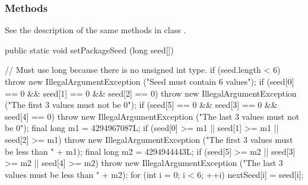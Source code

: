 \subsubsection* {Methods}
See the description of the same methods in class .
\begin{code}

   public static void setPackageSeed (long seed[]) \begin{hide} {
      // Must use long because there is no unsigned int type.
      if (seed.length < 6)
         throw new IllegalArgumentException ("Seed must contain 6 values");
      if (seed[0] == 0 && seed[1] == 0 && seed[2] == 0)
         throw new IllegalArgumentException
             ("The first 3 values must not be 0");
      if (seed[5] == 0 && seed[3] == 0 && seed[4] == 0)
         throw new IllegalArgumentException
             ("The last 3 values must not be 0");
      final long m1 = 4294967087L;
      if (seed[0] >= m1 || seed[1] >= m1 || seed[2] >= m1)
         throw new IllegalArgumentException
             ("The first 3 values must be less than " + m1);
      final long m2 = 4294944443L;
      if (seed[5] >= m2 || seed[3] >= m2 || seed[4] >= m2)
         throw new IllegalArgumentException
             ("The last 3 values must be less than " + m2);
      for (int i = 0; i < 6;  ++i)
         nextSeed[i] = seed[i];
   }\end{hide}
\end{code}
\iffalse
  \begin{tabb}  Sets the initial seed for the class \texttt{MRG32k3aL} to the
   six integers in the vector \texttt{seed[0..5]}.
   This will be the seed (initial state) of the first stream.
   If this method is not called, the default initial seed
   is $(12345, 12345, 12345, 12345, 12345, 12345)$.
   If it is called, the first 3 values of the seed must all be
   less than $m_1 = 4294967087$, and not all 0;
   and the last 3 values
   must all be less than $m_2 = 4294944443$, and not all 0.
 \end{tabb}
\fi
\begin{htmlonly}
\end{htmlonly}
